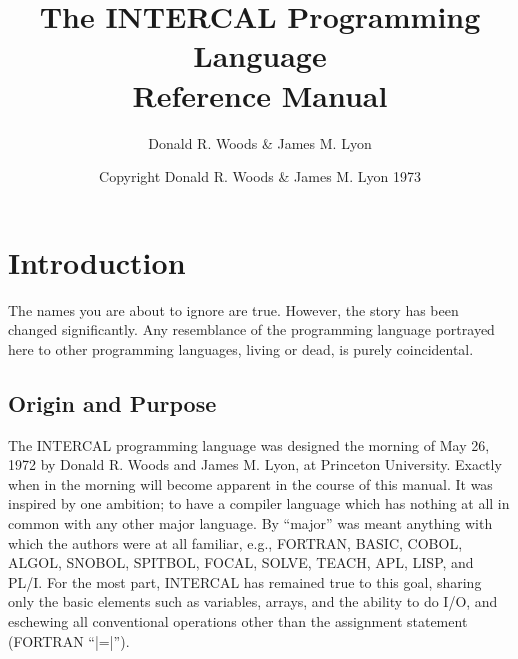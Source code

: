
\title{                 The INTERCAL Programming Language \\
                                Reference Manual}
\author{                        Donald R. Woods \& James M. Lyon}
\date{                Copyright Donald R. Woods \& James M. Lyon 1973}


\continuationchartrue
\asciitoebcdictrue




\maketitle
\thispagestyle{empty}
\newpage

\tableofcontents
\thispagestyle{empty}
\newpage
\setcounter{page}{1}

\section{Introduction}

The names you are about to ignore are true.  However, the story has been
changed significantly.  Any resemblance of the programming language
portrayed here to other programming languages, living or dead, is purely
coincidental.

\subsection{Origin and Purpose}

The INTERCAL programming language was designed the morning of May 26, 1972
by Donald R. Woods and James M. Lyon, at Princeton University.  Exactly
when in the morning will become apparent in the course of this manual.  It
was inspired by one ambition; to have a compiler language which has nothing
at all in common with any other major language.  By ``major'' was meant
anything with which the authors were at all familiar, e.g., FORTRAN, BASIC,
COBOL, ALGOL, SNOBOL, SPITBOL, FOCAL, SOLVE, TEACH, APL, LISP, and PL/I.
For the most part, INTERCAL has remained true to this goal, sharing only
the basic elements such as variables, arrays, and the ability to do I/O,
and eschewing all conventional operations other than the assignment
statement (FORTRAN ``|=|'').

